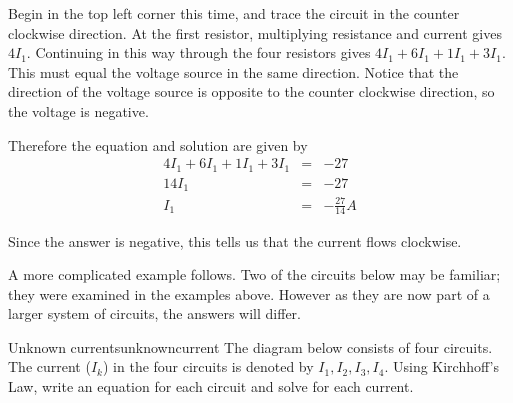 \begin{solution}
Begin in the top left corner this time, and trace the circuit in the counter clockwise direction. At the first resistor, multiplying resistance and current gives $4I_1$. Continuing in this way through the four resistors gives $4I_1 + 6I_1 + 1 I_1 + 3I_1$. This must equal the voltage source in the same direction. Notice that the direction of the voltage source is opposite to the counter clockwise direction, so the voltage is negative. 

Therefore the equation and solution are given by
\begin{eqnarray*}
4I_1 + 6I_1 + 1 I_1 + 3I_1&=& -27 \\
14I_1 &=& -27 \\
I_1 &=& -\frac{27}{14} A
\end{eqnarray*}

Since the answer is negative, this tells us that the current flows clockwise. 
\end{solution}

A more complicated example follows. Two of the circuits below may be familiar; they were examined in the examples above. However as they are now part of a larger system of circuits, the answers will differ. 

\begin{example}{Unknown currents}{unknowncurrent}
The diagram below consists of four circuits. The current ($I_k$) in the four circuits is denoted by $I_{1},I_{2},I_{3},I_{4}$. Using Kirchhoff's Law, write an equation for each circuit and solve for each current.
\end{example}

